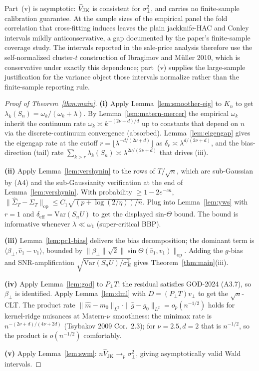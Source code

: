 \begin{remark}\label{rem:jk-finite}
Part~(v) is asymptotic: $\widehat V_{\rm JK}$ is consistent for $\sigma_\perp^2$, and
carries no finite-sample calibration guarantee. At the sample sizes of the empirical
panel the fold correlation that cross-fitting induces leaves the plain jackknife-HAC
and Conley intervals mildly anticonservative, a gap documented by the paper's
finite-sample coverage study. The intervals reported in the sale-price analysis therefore use the
self-normalized cluster-$t$ construction of Ibragimov and M\"uller 2010, which is
conservative under exactly this dependence; part~(v) supplies the large-sample
justification for the variance object those intervals normalize rather than the
finite-sample reporting rule.
\end{remark}



\begin{proof}[Proof of Theorem~\ref{thm:main}]
\textbf{(i)} Apply Lemma~\ref{lem:smoother-eig} to $K_n$ to get
$\lambda_k(S_n)=\omega_k/(\omega_k+\lambda)$. By Lemma~\ref{lem:matern-mercer}
the empirical $\omega_k$ inherit the continuum rate $\omega_k\asymp k^{-(2\nu+d)/d}$
up to constants that depend on $n$ via the discrete-continuum convergence
(absorbed). Lemma~\ref{lem:eigengap} gives the eigengap rate at the cutoff
$r=\lfloor\lambda^{-d/(2\nu+d)}\rfloor$ as $\delta_r\asymp\lambda^{d/(2\nu+d)}$,
and the bias-direction (tail) rate $\sum_{k>r}\lambda_k(S_n)\asymp\lambda^{2\nu/(2\nu+d)}$
that drives (iii).

\textbf{(ii)} Apply Lemma~\ref{lem:vershynin} to the rows of $T/\sqrt{n}$, which
are sub-Gaussian by (A4) and the sub-Gaussianity verification at the end of
Lemma~\ref{lem:vershynin}. With probability $\ge 1-2e^{-cn}$,
$\|\widehat\Sigma_T-\Sigma_T\|_{\mathrm{op}}\le C_1\sqrt{(p+\log(2/\eta))/n}$.
Plug into Lemma~\ref{lem:yws} with $r=1$ and $\delta_{\mathrm{eff}}=\mathrm{Var}(S_nU)$
to get the displayed sin-$\Theta$ bound. The bound is informative whenever
$\lambda\ll\omega_1$ (super-critical BBP).

\textbf{(iii)} Lemma~\ref{lem:pc1-bias} delivers the bias decomposition; the
dominant term is $\langle\beta_\perp,\widehat v_1-v_1\rangle$, bounded by
$\|\beta_\perp\|\sqrt 2\|\sin\Theta(\widehat v_1,v_1)\|_{\mathrm{op}}$. Adding
the $g$-bias and SNR-amplification $\sqrt{\mathrm{Var}(S_nU)/\sigma_E^2}$
gives Theorem~\ref{thm:main}(iii).

\textbf{(iv)} Apply Lemma~\ref{lem:god} to $P_\perp T$: the residual satisfies
GOD-2024 (A3.7), so $\beta_\perp$ is identified. Apply Lemma~\ref{lem:dml} with
$D=(P_\perp T)v_\perp$ to get the $\sqrt n$-CLT. The product rate
$\|\widehat m-m_0\|_{L^2}\cdot\|\widehat g-g_0\|_{L^2}=o_p(n^{-1/2})$ holds for
kernel-ridge nuisances at Matern-$\nu$ smoothness: the minimax rate is
$n^{-(2\nu+d)/(4\nu+2d)}$ (Tsybakov 2009 Cor.~2.3); for $\nu=2.5,d=2$ that is
$n^{-1/2}$, so the product is $o(n^{-1/2})$ comfortably.

\textbf{(v)} Apply Lemma~\ref{lem:swm}: $n\widehat V_{\mathrm{JK}}\to_p\sigma_\perp^2$,
giving asymptotically valid Wald intervals.
\end{proof}
